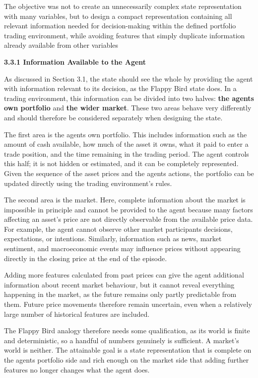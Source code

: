 The objective was not to create an unnecessarily complex state
representation with many variables, but to design a compact
representation containing all relevant information needed for
decision-making within the defined portfolio trading environment, while
avoiding features that simply duplicate information already available
from other variables

\textbf{3.3.1 Information Available to the Agent}

As discussed in Section 3.1, the state should see the whole by providing
the agent with information relevant to its decision, as the Flappy Bird
state does. In a trading environment, this information can be divided
into two halves: \textbf{the agent\textquotesingle s own portfolio} and
\textbf{the wider market}. These two areas behave very differently and
should therefore be considered separately when designing the state.

The first area is the agent\textquotesingle s own portfolio. This
includes information such as the amount of cash available, how much of
the asset it owns, what it paid to enter a trade position, and the time
remaining in the trading period. The agent controls this half; it is not
hidden or estimated, and it can be completely represented. Given the
sequence of the asset prices and the agent\textquotesingle s actions,
the portfolio can be updated directly using the trading environment's
rules.

The second area is the market. Here, complete information about the
market is impossible in principle and cannot be provided to the agent
because many factors affecting an asset's price are not directly
observable from the available price data. For example, the agent cannot
observe other market participants\textquotesingle{} decisions,
expectations, or intentions. Similarly, information such as news, market
sentiment, and macroeconomic events may influence prices without
appearing directly in the closing price at the end of the episode.

Adding more features calculated from past prices can give the agent
additional information about recent market behaviour, but it cannot
reveal everything happening in the market, as the future remains only
partly predictable from them. Future price movements therefore remain
uncertain, even when a relatively large number of historical features
are included.

The Flappy Bird analogy therefore needs some qualification, as its world
is finite and deterministic, so a handful of numbers genuinely is
sufficient. A market's world is neither. The attainable goal is a state
representation that is complete on the agent\textquotesingle s portfolio
side and rich enough on the market side that adding further features no
longer changes what the agent does.

